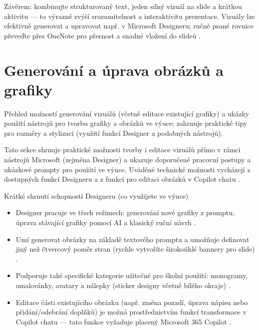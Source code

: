 \documentclass{report}%
\begin{document}
Závěrem: kombinujte strukturovaný text, jeden silný vizuál na slide a krátkou aktivitu — to výrazně zvýší srozumitelnost a interaktivitu prezentace. Vizuály lze efektivně generovat a upravovat např. v Microsoft Designeru; ručně psané rovnice převeďte přes OneNote pro přesnost a snadné vložení do slideů \cite{kb_ai_101_tipu_pdf_04e4a115_page_51_1, kb_ai_101_tipu_pdf_04e4a115_page_8_1}.%

%
\section{Generování a úprava obrázků a grafiky}%
Přehled možností generování vizuálů (včetně editace existující grafiky) a ukázky použití nástrojů pro tvorbu grafiky a obrázků ve výuce; zahrnuje praktické tipy pro rozměry a stylizaci (využití funkcí Designer a podobných nástrojů).%


%
Tato sekce shrnuje praktické možnosti tvorby i editace vizuálů přímo v rámci nástrojů Microsoft (zejména Designer) a ukazuje doporučené pracovní postupy a ukázkové prompty pro použití ve výuce. Uváděné technické možnosti vycházejí z dostupných funkcí Designeru a z funkcí pro editaci obrázků v Copilot chatu \cite{kb_ai_101_tipu_pdf_04e4a115_page_51_1, kb_ai_101_tipu_pdf_04e4a115_page_52_2}.

Krátké shrnutí schopností Designeru (co využijete ve výuce)
\begin{itemize}
  \item Designer pracuje ve třech režimech: generování nové grafiky z promptu, úprava stávající grafiky pomocí AI a klasický ruční návrh \cite{kb_ai_101_tipu_pdf_04e4a115_page_51_1}.
  \item Umí generovat obrázky na základě textového promptu a umožňuje definovat jiný než čtvercový poměr stran (rychle vytvoříte širokoúhlé bannery pro slide) \cite{kb_ai_101_tipu_pdf_04e4a115_page_51_1}.
  \item Podporuje také specifické kategorie užitečné pro školní použití: monogramy, omalovánky, avatary a nálepky (sticker designy včetně bílého okraje) \cite{kb_ai_101_tipu_pdf_04e4a115_page_51_1}.
  \item Editace části existujícího obrázku (např. změna pozadí, úprava nápisu nebo přidání/odebrání doplňků) je možná prostřednictvím funkcí transformace v Copilot chatu — tato funkce vyžaduje placený Microsoft 365 Copilot \cite{kb_ai_101_tipu_pdf_04e4a115_page_52_2}.
\end{itemize}
\end{document}
